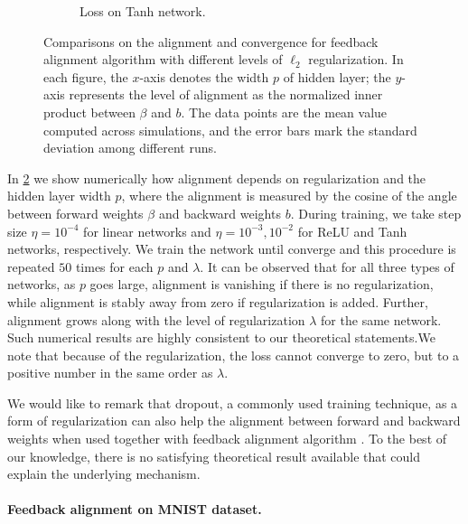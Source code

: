 \begin{figure}[h]
\begin{subfigure}[b]{.33\textwidth}
  \caption{Loss on Tanh network.}
  \label{fig:loss_nn_tanh_autograd_l2}
\end{subfigure}
\caption{Comparisons on the alignment and convergence for feedback alignment algorithm with different levels of $\ell_2$ regularization. In each figure, the $x$-axis denotes the width $p$ of hidden layer; the $y$-axis represents the level of alignment as the normalized inner product between $\beta$ and $b$. The data points are the mean value computed across simulations, and the error bars mark the standard deviation among different runs.}
\label{fig:synthetic-l2}
\end{figure}

In \cref{fig:synthetic-l2} we show numerically how alignment depends on regularization and the hidden layer width $p$, where the alignment is measured by the cosine of the angle between forward weights $\beta$ and backward weights $b$. During training, we take step size $\eta = 10^{-4}$ for linear networks and $\eta = 10^{-3},10^{-2}$ for ReLU and Tanh networks, respectively. We train the network until converge and this procedure is repeated $50$ times for each $p$ and $\lambda$. It can be observed that for all three types of networks, as $p$ goes large, alignment is vanishing if there is no regularization, while alignment is stably away from zero if regularization is added. Further, alignment grows along with the level of regularization $\lambda$ for the same network. Such numerical results are highly consistent to our theoretical statements.We note that because of the regularization, the loss cannot converge to zero, but to a positive number  in the same order as $\lambda$.

We would like to remark that dropout, a commonly used training technique, as a form of regularization can also help the alignment between forward and backward weights when used together with feedback alignment algorithm \citep{wager2013dropout}. To the best of our knowledge, there is no satisfying theoretical result available that could explain the underlying mechanism.


\paragraph{Feedback alignment on MNIST dataset.}

